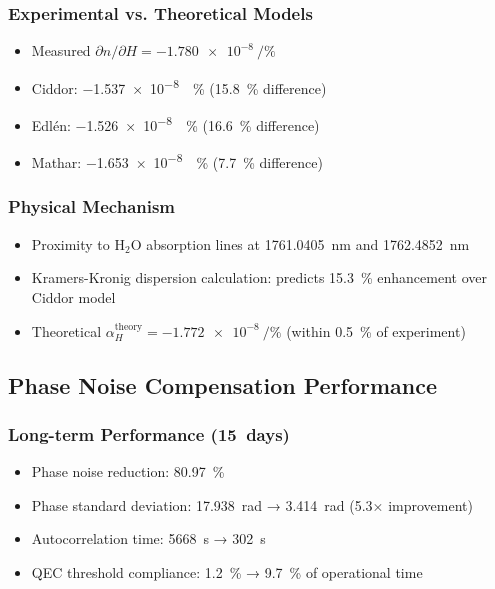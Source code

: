 \documentclass[aps,prl,reprint,groupedaddress,onecolumn,superscriptaddress]{revtex4-2}
\begin{document}
\subsubsection{Experimental vs. Theoretical Models}
\begin{itemize}
    \item Measured $\partial n/\partial H = \SI{-1.780e-8}{\per\percent}$
    \item Ciddor\cite{ciddor1996refractive}: \SI{-1.537e-8}{\per\percent} (\SI{+15.8}{\percent} difference)
    \item Edlén\cite{edlen1966refractive}: \SI{-1.526e-8}{\per\percent} (\SI{+16.6}{\percent} difference)
    \item Mathar\cite{mathar2007refractive}: \SI{-1.653e-8}{\per\percent} (\SI{+7.7}{\percent} difference)
\end{itemize}

\subsubsection{Physical Mechanism}
\begin{itemize}
    \item Proximity to H$_2$O absorption lines at \SI{1761.0405}{\nano\meter} and \SI{1762.4852}{\nano\meter} \cite{kochanov2016hitran}
    \item Kramers-Kronig dispersion calculation\cite{perakis2016vibrational}: predicts \SI{+15.3}{\percent} enhancement over Ciddor model
    \item Theoretical $\alpha_H^{\text{theory}} = \SI{-1.772e-8}{\per\percent}$ (within \SI{0.5}{\percent} of experiment)
\end{itemize}

\subsection{Phase Noise Compensation Performance}

\subsubsection{Long-term Performance (\SI{15}{days})}
\begin{itemize}
    \item Phase noise reduction: \SI{80.97}{\percent}
    \item Phase standard deviation: \SI{17.938}{\radian} → \SI{3.414}{\radian} (\num{5.3}× improvement)
    \item Autocorrelation time: \SI{5668}{\second} → \SI{302}{\second}
    \item QEC threshold \cite{preskill1998reliable,fowler2012surface, terhal2015quantum} compliance: \SI{1.2}{\percent} → \SI{9.7}{\percent} of operational time
\end{itemize}
\end{document}
